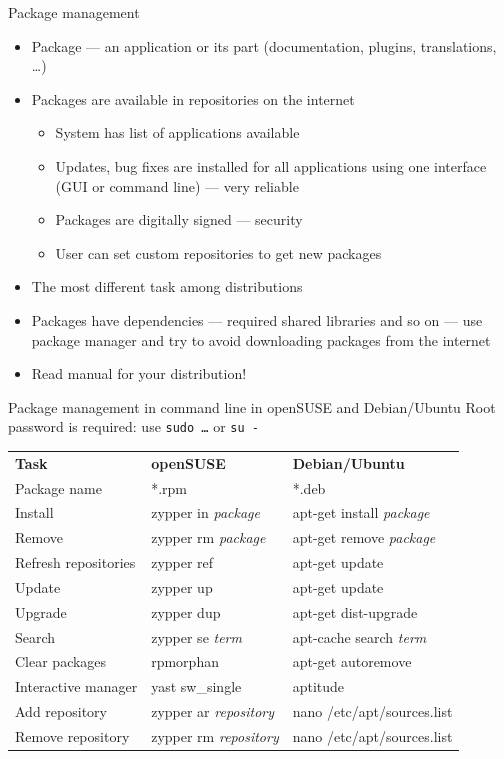 \documentclass[hyperref={bookmarks=true, unicode=true, colorlinks=true, pdftitle={Linux, command line and MetaCentrum}, plainpages=false, pdfauthor={Vojtech Zeisek}, pdfsubject={Course about use of Linux command line, writing shell scripts and using MetaCentrum of CESNET}, pdfcreator={XeLaTeX, http://www.xelatex.org/}, pdfkeywords={Linux, GNU, BASH, shell, command line, MetaCentrum}, linkcolor=Sienna, anchorcolor=black, citecolor=green, filecolor=magenta, menucolor=Sienna, urlcolor=cyan, pdftex}, compress, ucs, xelatex, xcolor=svgnames, 11pt]{beamer}
\begin{document}
\begin{frame}{Package management}
\begin{itemize}
  \item Package --- an application or its part (documentation, plugins, translations, \ldots)
  \item Packages are available in repositories on the internet
  \begin{itemize}
    \item System has list of applications available
    \item Updates, bug fixes are installed for all applications using one interface (GUI or command line) --- very reliable
    \item Packages are digitally signed --- security
    \item User can set custom repositories to get new packages
  \end{itemize}
  \item The most different task among distributions
  \item Packages have dependencies --- required shared libraries and so on --- use package manager and try to avoid downloading packages from the internet
  \item \alert{Read manual for your distribution!}
\end{itemize}
\end{frame}

\begin{frame}{Package management in command line in openSUSE and Debian/Ubuntu}
Root password is required: use \texttt{sudo \ldots} or \texttt{su -}
\begin{center}
\begin{tabular}{lll}
\textbf{Task} & \textbf{openSUSE} & \textbf{Debian/Ubuntu}\\
Package name & *.rpm & *.deb\\
Install & zypper in \textit{package} & apt-get install \textit{package}\\
Remove & zypper rm \textit{package} & apt-get remove \textit{package}\\
Refresh repositories & zypper ref & apt-get update\\
Update & zypper up & apt-get update\\
Upgrade & zypper dup & apt-get dist-upgrade\\
Search & zypper se \textit{term} & apt-cache search \textit{term}\\
Clear packages & rpmorphan & apt-get autoremove\\
Interactive manager & yast sw\_single & aptitude\\
Add repository & zypper ar \textit{repository} & nano /etc/apt/sources.list\\
Remove repository & zypper rm \textit{repository} & nano /etc/apt/sources.list
\end{tabular}
\end{center}
\end{frame}
\end{document}
